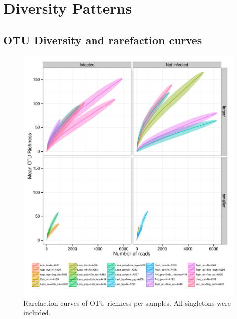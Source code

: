 \documentclass[a4paper, 11]{article}\usepackage[]{graphicx}\usepackage[]{color}
\makeatletter
\def\maxwidth{ %
  \ifdim\Gin@nat@width>\linewidth
    \linewidth
  \else
    \Gin@nat@width
  \fi
}
\newenvironment{knitrout}{}{} %
\makeatother
\begin{document}
\newpage
\section{Diversity Patterns}
\subsection{OTU Diversity and rarefaction curves}
\begin{knitrout}
\color{fgcolor}\begin{figure}[H]
\includegraphics[width=\maxwidth]{figure/rarefact-1} \caption[Rarefaction curves of OTU richness per samples]{Rarefaction curves of OTU richness per samples. All singletons were included.}\label{fig:rarefact}
\end{figure}


\end{knitrout}
%
\end{document}
